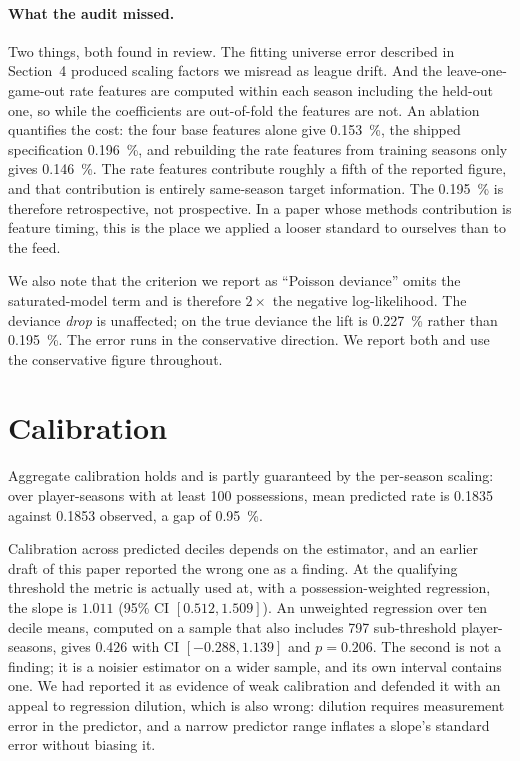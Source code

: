 \documentclass[11pt,a4paper]{article}
\begin{document}
\paragraph{What the audit missed.} Two things, both found in review. The fitting
universe error described in Section~4 produced scaling factors we misread as
league drift. And the leave-one-game-out rate features are computed within each
season including the held-out one, so while the coefficients are out-of-fold the
features are not. An ablation quantifies the cost: the four base features alone
give \SI{0.153}{\percent}, the shipped specification \SI{0.196}{\percent}, and
rebuilding the rate features from training seasons only gives
\SI{0.146}{\percent}. The rate features contribute roughly a fifth of the reported
figure, and that contribution is entirely same-season target information. The
\SI{0.195}{\percent} is therefore retrospective, not prospective. In a paper whose
methods contribution is feature timing, this is the place we applied a looser
standard to ourselves than to the feed.

We also note that the criterion we report as ``Poisson deviance'' omits the
saturated-model term and is therefore $2\times$ the negative log-likelihood. The
deviance \emph{drop} is unaffected; on the true deviance the lift is
\SI{0.227}{\percent} rather than \SI{0.195}{\percent}. The error runs in the
conservative direction. We report both and use the conservative figure throughout.

\section{Calibration}
\label{sec:calibration}

Aggregate calibration holds and is partly guaranteed by the per-season scaling:
over player-seasons with at least 100 possessions, mean predicted rate is 0.1835
against 0.1853 observed, a gap of \SI{0.95}{\percent}.

Calibration across predicted deciles depends on the estimator, and an earlier
draft of this paper reported the wrong one as a finding. At the qualifying
threshold the metric is actually used at, with a possession-weighted regression,
the slope is $1.011$ (95\% CI $[0.512, 1.509]$). An unweighted regression over ten
decile means, computed on a sample that also includes 797 sub-threshold
player-seasons, gives $0.426$ with CI $[-0.288, 1.139]$ and $p = 0.206$. The
second is not a finding; it is a noisier estimator on a wider sample, and its own
interval contains one. We had reported it as evidence of weak calibration and
defended it with an appeal to regression dilution, which is also wrong: dilution
requires measurement error in the predictor, and a narrow predictor range inflates
a slope's standard error without biasing it.
\end{document}
